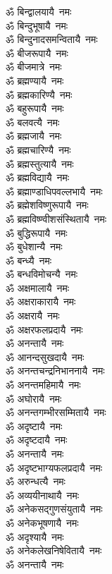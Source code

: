 \begin{flushleft}
\begin{multicols}{2}
ॐ बिन्द्वालयायै~नमः\\
ॐ बिन्दुभूषायै~नमः\\
ॐ बिन्दुनादसमन्वितायै~नमः\\
ॐ बीजरूपायै~नमः\\
ॐ बीजमात्रे~नमः\\
ॐ ब्रह्मण्यायै~नमः\\
ॐ ब्रह्मकारिण्यै~नमः\\
ॐ बहुरूपायै~नमः\\
ॐ बलवत्यै~नमः\hfill{}\\
ॐ ब्रह्मजायै~नमः\\
ॐ ब्रह्मचारिण्यै~नमः\\
ॐ ब्रह्मस्तुत्यायै~नमः\\
ॐ ब्रह्मविद्यायै~नमः\\
ॐ ब्रह्माण्डाधिपवल्लभायै~नमः\\
ॐ ब्रह्मेशविष्णुरूपायै~नमः\\
ॐ ब्रह्मविष्ण्वीशसंस्थितायै~नमः\\
ॐ बुद्धिरूपायै~नमः\\
ॐ बुधेशान्यै~नमः\\
ॐ बन्ध्यै~नमः\hfill{}\\
ॐ बन्धविमोचन्यै~नमः\\
ॐ अक्षमालायै~नमः\\
ॐ अक्षराकारायै~नमः\\
ॐ अक्षरायै~नमः\\
ॐ अक्षरफलप्रदायै~नमः\\
ॐ अनन्तायै~नमः\\
ॐ आनन्दसुखदायै~नमः\\
ॐ अनन्तचन्द्रनिभाननायै~नमः\\
ॐ अनन्तमहिमायै~नमः\\
ॐ अघोरायै~नमः\hfill{}\\
ॐ अनन्तगम्भीरसम्मितायै~नमः\\
ॐ अदृष्टायै~नमः\\
ॐ अदृष्टदायै~नमः\\
ॐ अनन्तायै~नमः\\
ॐ अदृष्टभाग्यफलप्रदायै~नमः\\
ॐ अरुन्धत्यै~नमः\\
ॐ अव्ययीनाथायै~नमः\\
ॐ अनेकसद्गुणसंयुतायै~नमः\\
ॐ अनेकभूषणायै~नमः\\
ॐ अदृश्यायै~नमः\hfill{}\\
ॐ अनेकलेखनिषेवितायै~नमः\\
ॐ अनन्तायै~नमः\\

\end{multicols}
\end{flushleft}

